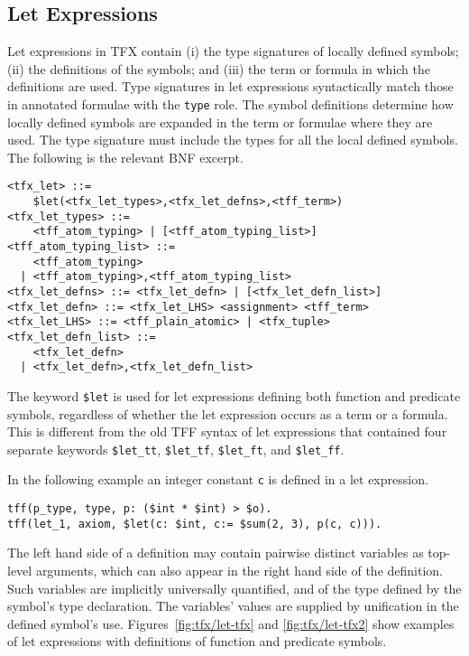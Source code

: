 \subsection{Let Expressions}

Let expressions in TFX contain (i) the type signatures of locally defined 
symbols; (ii) the definitions of the symbols; and (iii) the term or formula
in which the definitions are used. 
Type signatures in let expressions syntactically match those in annotated 
formulae with the \lstinline'type' role. 
The symbol definitions determine how locally defined symbols are expanded 
in the term or formulae where they are used.
The type signature must include the types for all the local defined symbols.
The following is the relevant BNF excerpt.
\begin{lstlisting}[language=bnf]
<tfx_let> ::=
    $let(<tfx_let_types>,<tfx_let_defns>,<tff_term>)
<tfx_let_types> ::=
    <tff_atom_typing> | [<tff_atom_typing_list>]
<tff_atom_typing_list> ::=
    <tff_atom_typing>
  | <tff_atom_typing>,<tff_atom_typing_list>
<tfx_let_defns> ::= <tfx_let_defn> | [<tfx_let_defn_list>]
<tfx_let_defn> ::= <tfx_let_LHS> <assignment> <tff_term>
<tfx_let_LHS> ::= <tff_plain_atomic> | <tfx_tuple>
<tfx_let_defn_list> ::=
    <tfx_let_defn>
  | <tfx_let_defn>,<tfx_let_defn_list>
\end{lstlisting}

The keyword \lstinline'$let' is used for let expressions defining both function and 
predicate symbols, regardless of whether the let expression occurs as a term 
or a formula. 
This is different from the old TFF syntax of let expressions that contained 
four separate keywords \lstinline'$let_tt', \lstinline'$let_tf', \lstinline'$let_ft', and 
\lstinline'$let_ff'.

In the following example an integer constant \lstinline'c' is defined in a let expression.
\begin{lstlisting}[language=tptp]
tff(p_type, type, p: ($int * $int) > $o).
tff(let_1, axiom, $let(c: $int, c:= $sum(2, 3), p(c, c))).
\end{lstlisting}

The left hand side of a definition may contain pairwise distinct variables 
as top-level arguments, which can also appear in the right hand side
of the definition.
Such variables are implicitly universally quantified, and of the type 
defined by the symbol's type declaration.
The variables' values are supplied by unification in the defined symbol's use.
Figures~\ref{fig:tfx/let-tfx} and \ref{fig:tfx/let-tfx2} show examples of let expressions with definitions of function and predicate symbols.

